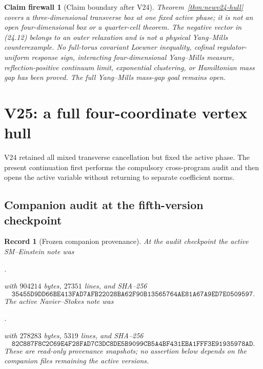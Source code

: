 \documentclass[11pt,oneside]{article}
\newtheorem{firewall}[theorem]{Claim firewall}
\newtheorem{record}[theorem]{Record}
\theoremstyle{definition}
\theoremstyle{remark}
\begin{document}
\begin{firewall}[Claim boundary after V24]
\label{fire:newv24-final}
Theorem~\ref{thm:newv24-hull} covers a three-dimensional transverse
box at one fixed active phase; it is not an open four-dimensional
box or a quarter-cell theorem.  The negative vector in (24.12)
belongs to an outer relaxation and is not a physical Yang--Mills
counterexample.  No full-torus covariant Loewner inequality,
cofinal regulator-uniform response sign, interacting
four-dimensional Yang--Mills measure, reflection-positive continuum
limit, exponential clustering, or Hamiltonian mass gap has been
proved.  The full Yang--Mills mass-gap goal remains open.
\end{firewall}

\section{V25: a full four-coordinate vertex hull}
\label{sec:newv25-four-hull}

V24 retained all mixed transverse cancellation but fixed the active
phase.  The present continuation first performs the compulsory
cross-program audit and then opens the active variable without
returning to separate coefficient norms.

\subsection{Companion audit at the fifth-version checkpoint}

\begin{record}[Frozen companion provenance]
\label{rec:newv25-companions}
At the audit checkpoint the active SM--Einstein note was
\begin{center}
.
\end{center}
with \(904214\) bytes, \(27351\) lines, and SHA--256
\[
\texttt{35455D9DD66BE413FAD7AFB22028BA62F90B13565764AE81A67A9ED7E0509597}.
                                                               \tag{25.1}
\]
The active Navier--Stokes note was
\begin{center}
.
\end{center}
with \(278283\) bytes, \(5319\) lines, and SHA--256
\[
\texttt{82C887F8C2C69E4F28FAD7C3DC8DE5B9099CB5A4BF431EBA1FFF3E91935978AD}.
                                                               \tag{25.2}
\]
These are read-only provenance snapshots; no assertion below depends
on the companion files remaining the active versions.
\end{record}
\end{document}
